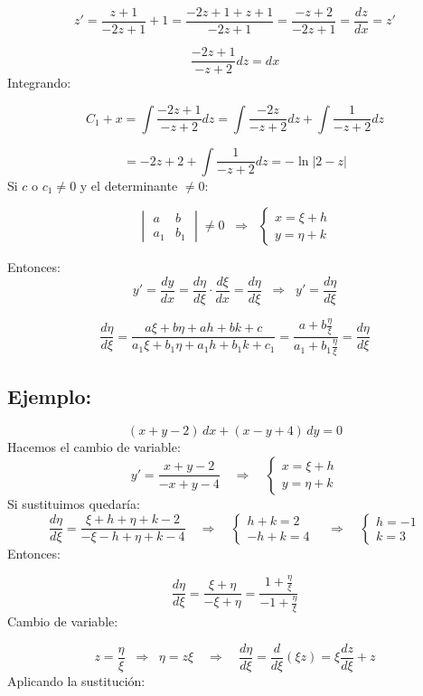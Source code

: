 \documentclass[a4paper,12pt]{article}
\begin{document}
\[
z' = \frac{z + 1}{-2z + 1} + 1 = \frac{-2z + 1 + z + 1}{-2z + 1} = \frac{-z + 2}{-2z + 1} =
\frac{dz}{dx} = z'
\]

\[
\frac{-2z + 1}{-z + 2} dz = dx
\]
Integrando:

\[
C_1 + x = \int \frac{-2z + 1}{-z + 2} dz = \int \frac{-2z}{-z + 2} dz + \int \frac{1}{-z + 2} dz
\]

\[
= -2z + 2 + \int \frac{1}{-z + 2} dz = -\ln|2 - z|
\]
Si $c$ o $c_1 \neq 0$ y el determinante $\neq 0$:

\[
\begin{vmatrix}
a & b \\
a_1 & b_1
\end{vmatrix} \neq 0
\;\;\Rightarrow\;\;
\begin{cases}
x = \xi + h \\
y = \eta + k
\end{cases}
\]

\medskip
\noindent
Entonces:
\[
y' = \frac{dy}{dx} = \frac{d\eta}{d\xi}\cdot \frac{d\xi}{dx} 
= \frac{d\eta}{d\xi} \;\;\Rightarrow\;\; y' = \frac{d\eta}{d\xi}
\]

\[
\frac{d\eta}{d\xi} = 
\frac{a\xi + b\eta + ah + bk + c}{a_1\xi + b_1\eta + a_1 h + b_1 k + c_1}
= \frac{a + b\frac{\eta}{\xi}}{a_1 + b_1\frac{\eta}{\xi}}
= \frac{d\eta}{d\xi}
\]
\newpage
\noindent
\subsection*{Ejemplo:}
\vspace{-1.2em}
\[
(x+y-2)\,dx + (x-y+4)\,dy = 0
\]
Hacemos el cambio de variable:
\[
y' = \frac{x+y-2}{-x+y-4}
\quad \Rightarrow \quad
\begin{cases}
x = \xi + h \\
y = \eta + k
\end{cases}
\]
Si sustituimos quedaría:
\[
\frac{d\eta}{d\xi} = \frac{\xi + h + \eta + k - 2}{-\xi - h + \eta + k - 4}
\quad \Rightarrow \quad
\begin{cases}
h+k=2 \\
-h+k=4
\end{cases}
\quad \Rightarrow \quad
\begin{cases}
h=-1 \\
k=3
\end{cases}
\]
Entonces:

\[
\frac{d\eta}{d\xi} = \frac{\xi + \eta}{-\xi + \eta}
= \frac{1+\tfrac{\eta}{\xi}}{-1+\frac{\eta}{\xi}}
\]
Cambio de variable:

\[
z = \frac{\eta}{\xi} \;\;\Rightarrow\;\; \eta = z\xi
\quad \Rightarrow \quad
\frac{d\eta}{d\xi} = \frac{d}{d\xi}(\xi z) = \xi \frac{dz}{d\xi} + z
\]
Aplicando la sustitución:
\end{document}
